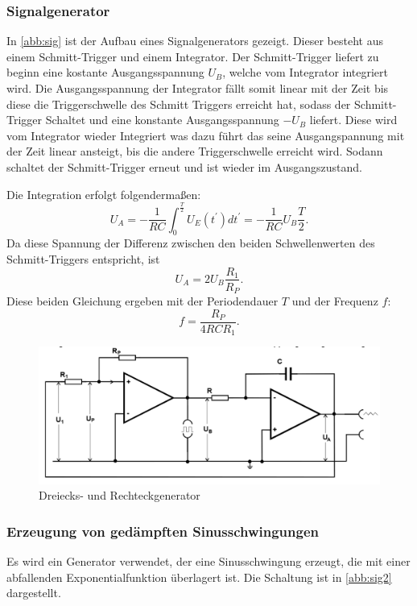 \subsubsection{Signalgenerator}
In \autoref{abb:sig} ist der Aufbau eines Signalgenerators gezeigt. Dieser besteht aus einem Schmitt-Trigger und einem Integrator. Der Schmitt-Trigger liefert zu beginn eine kostante Ausgangsspannung $U_B$,
welche vom Integrator integriert wird. Die Ausgangsspannung der Integrator fällt somit linear mit der Zeit bis diese die Triggerschwelle des Schmitt Triggers erreicht hat, sodass der Schmitt-Trigger Schaltet und eine konstante Ausgangsspannung $-U_B$ liefert. Diese wird vom Integrator wieder Integriert was dazu führt das seine Ausgangspannung mit der Zeit linear ansteigt, bis die andere Triggerschwelle erreicht wird. Sodann schaltet der Schmitt-Trigger erneut und ist wieder im Ausgangszustand.

Die Integration erfolgt folgendermaßen:
\begin{equation}
U_A = - \frac{1}{RC} \int_{0}^{\frac{T}{2}} U_E(t^\prime)dt^\prime = -\frac{1}{RC} U_B \frac{T}{2} .
\end{equation}
Da diese Spannung der Differenz zwischen den beiden Schwellenwerten des Schmitt-Triggers entspricht, ist
\begin{equation}
U_A = 2U_B\frac{R_1}{R_P} .
\end{equation}
Diese beiden Gleichung ergeben mit der Periodendauer $T$ und der Frequenz $f$:
\begin{equation}
f = \frac{R_P}{4RCR_1} .
\end{equation}

\begin{figure}[h!]
 	\centering
 	\includegraphics[width=\textwidth]{img/gen.png}
 	\caption{Dreiecks- und Rechteckgenerator \cite{FP}}
 	\label{abb:sig}
\end{figure}

\subsubsection{Erzeugung von ged{\"a}mpften Sinusschwingungen}
Es wird ein Generator verwendet, der eine Sinusschwingung erzeugt, die mit einer abfallenden Exponentialfunktion überlagert ist. Die Schaltung ist in \autoref{abb:sig2} dargestellt.

